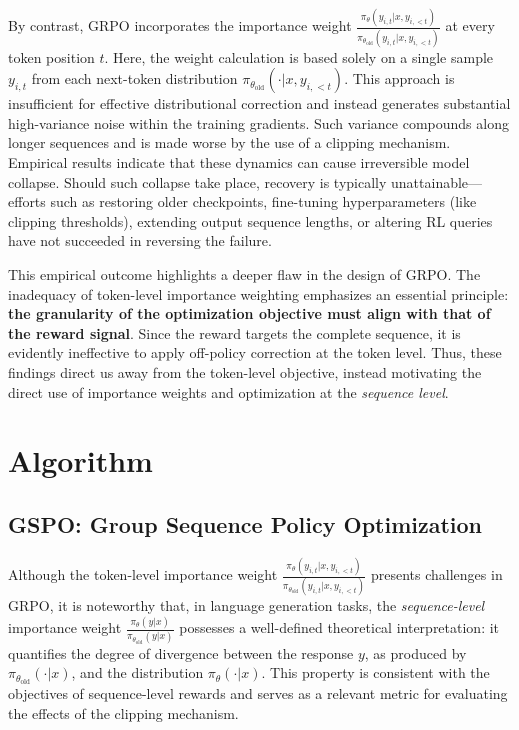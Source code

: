 By contrast, GRPO incorporates the importance weight $\frac{ \pi_{\theta} (y_{i,t} | x, y_{i,<t}) }{ \pi_{\theta_\text{old}} (y_{i,t} | x,y_{i,<t})}$ at every token position $t$. Here, the weight calculation is based solely on a single sample $y_{i,t}$ from each next-token distribution $\pi_{\theta_\text{old}}( \cdot | x, y_{i, <t})$. This approach is insufficient for effective distributional correction and instead generates substantial high-variance noise within the training gradients. Such variance compounds along longer sequences and is made worse by the use of a clipping mechanism. Empirical results indicate that these dynamics can cause irreversible model collapse. Should such collapse take place, recovery is typically unattainable—efforts such as restoring older checkpoints, fine-tuning hyperparameters (like clipping thresholds), extending output sequence lengths, or altering RL queries have not succeeded in reversing the failure.

This empirical outcome highlights a deeper flaw in the design of GRPO. The inadequacy of token-level importance weighting emphasizes an essential principle: \textbf{the granularity of the optimization objective must align with that of the reward signal}. Since the reward targets the complete sequence, it is evidently ineffective to apply off-policy correction at the token level. Thus, these findings direct us away from the token-level objective, instead motivating the direct use of importance weights and optimization at the \textit{sequence level}.

\section{Algorithm}

\subsection{GSPO: Group Sequence Policy Optimization}

Although the token-level importance weight $\frac{ \pi_{\theta} (y_{i,t} | x, y_{i,<t}) }{ \pi_{\theta_\text{old}} (y_{i,t} | x,y_{i,<t})}$ presents challenges in GRPO, it is noteworthy that, in language generation tasks, the \textit{sequence-level} importance weight $\frac{ \pi_{\theta} (y | x) }{ \pi_{\theta_\text{old}} (y | x)}$ possesses a well-defined theoretical interpretation: it quantifies the degree of divergence between the response $y$, as produced by $\pi_{\theta_\text{old}} (\cdot | x)$, and the distribution $\pi_{\theta} (\cdot | x)$. This property is consistent with the objectives of sequence-level rewards and serves as a relevant metric for evaluating the effects of the clipping mechanism.

